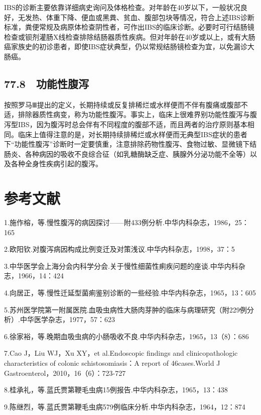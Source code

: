IBS的诊断主要依靠详细病史询问及体格检查。对年龄在40岁以下，一般状况良好，无发热、体重下降、便血或黑粪、贫血、腹部包块等情况，符合上述IBS诊断标准，粪便常规及病原体检查阴性者，可作出IBS的临床诊断。必要时可行结肠镜检查或钡剂灌肠X线检查排除结肠器质性疾病。但对年龄在40岁或以上，或有大肠癌家族史的初诊患者，即使IBS症状典型，仍以常规结肠镜检查为宜，以免漏诊大肠癌。

\subsection{77.8　功能性腹泻}

按照罗马Ⅲ提出的定义，长期持续或反复排稀烂或水样便而不伴有腹痛或腹部不适，排除器质性病变，称为功能性腹泻。事实上，临床上很难界别功能性腹泻与腹泻型IBS，因为腹泻时总会伴有不同程度的腹部不适，而且两者的治疗原则基本相同。临床上值得注意的是，对长期持续排稀烂或水样便而无典型IBS症状的患者下“功能性腹泻”诊断时一定要慎重，注意排除药物性腹泻、食物过敏、显微镜下结肠炎、各种病因的吸收不良综合征（如乳糖酶缺乏症、胰腺外分泌功能不全等）以及各种全身性疾病引起的腹泻。

\protect\hypertarget{text00192.html}{}{}

\section{参考文献}

1.施作榕，等.慢性腹泻的病因探讨------附433例分析.中华内科杂志，1986，25：165

2.欧阳钦.对腹泻病因构成比例变迁及对策浅议.中华内科杂志，1998，37：5

3.中华医学会上海分会内科学分会.关于慢性细菌性痢疾问题的座谈.中华内科杂志，1966，14：424

4.向居正，等.慢性迁延型菌痢鉴别诊断的一些经验.中华内科杂志，1965，13：605

5.苏州医学院第一附属医院.血吸虫病性大肠肉芽肿的临床与病理研究（附229例分析）.中华医学杂志，1977，57：623

6.徐家裕，等.晚期血吸虫病的小肠吸收不良.中华内科杂志，1965，13（8）：686

7.Cao J，Liu WJ，Xu XY，et al.Endoscopic findings and clinicopathologic
characteristics of colonic schistosomiasis：A report of 46cases.World J
Gastroenterol，2010，16（6）：723-727

8.桂承礼，等.蓝氏贾第鞭毛虫病15例报告.中华内科杂志，1965，13：438

9.陈继烈，等.蓝氏贾第鞭毛虫病579例临床分析.中华内科杂志，1964，12：874

